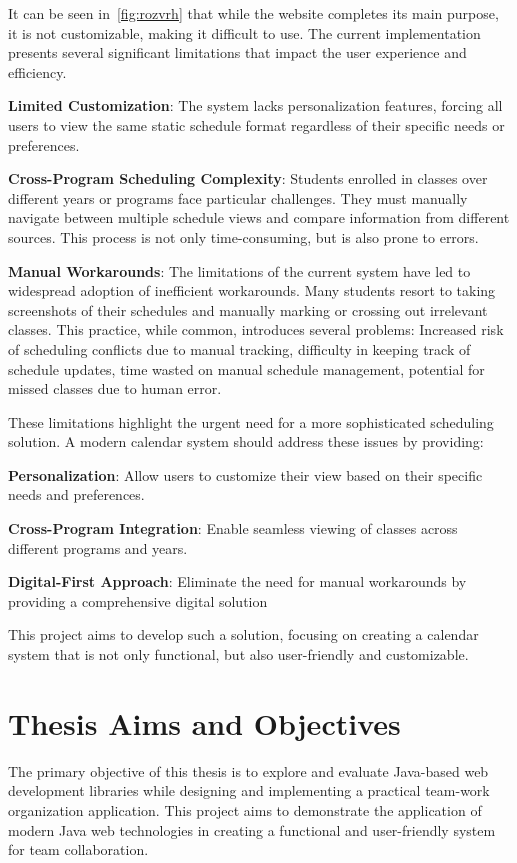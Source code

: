 It can be seen in~\ref{fig:rozvrh} that while the website completes its main purpose, it is not customizable, making it difficult to use.
The current implementation presents several significant limitations that impact the user experience and efficiency.

\textbf{Limited Customization}: The system lacks personalization features, forcing all users to view the same static schedule format regardless of their specific needs or preferences.

\textbf{Cross-Program Scheduling Complexity}: Students enrolled in classes over different years or programs face particular challenges.
They must manually navigate between multiple schedule views and compare information from different sources.
This process is not only time-consuming, but is also prone to errors.

\textbf{Manual Workarounds}: The limitations of the current system have led to widespread adoption of inefficient workarounds.
Many students resort to taking screenshots of their schedules and manually marking or crossing out irrelevant classes.
This practice, while common, introduces several problems:
Increased risk of scheduling conflicts due to manual tracking,
difficulty in keeping track of schedule updates,
time wasted on manual schedule management,
potential for missed classes due to human error.


These limitations highlight the urgent need for a more sophisticated scheduling solution.
A modern calendar system should address these issues by providing:

\textbf{Personalization}: Allow users to customize their view based on their specific needs and preferences.

\textbf{Cross-Program Integration}: Enable seamless viewing of classes across different programs and years.

\textbf{Digital-First Approach}: Eliminate the need for manual workarounds by providing a comprehensive digital solution

This project aims to develop such a solution, focusing on creating a calendar system that is not only functional, but also user-friendly and customizable.


\section{Thesis Aims and Objectives}\label{sec:thesis-aims}
The primary objective of this thesis is to explore and evaluate Java-based web development libraries while designing and implementing a practical team-work organization application.
This project aims to demonstrate the application of modern Java web technologies in creating a functional and user-friendly system for team collaboration.

